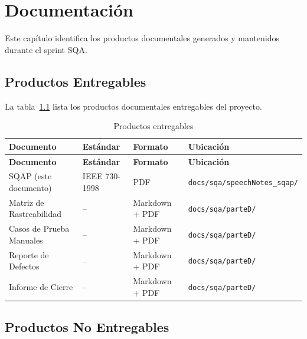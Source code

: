 \chapter{Documentación}
\label{sec:documentacion}

Este capítulo identifica los productos documentales generados y mantenidos durante el sprint SQA.

\section{Productos Entregables}
\label{sec:entregables}

La tabla~\ref{tab:entregables} lista los productos documentales entregables del proyecto.

\begin{longtable}{lp{4cm}p{4cm}p{3cm}}
\caption{Productos entregables}
\label{tab:entregables}\\
\toprule
\textbf{Documento} & \textbf{Estándar} & \textbf{Formato} & \textbf{Ubicación}\\
\midrule
\endfirsthead
\toprule
\textbf{Documento} & \textbf{Estándar} & \textbf{Formato} & \textbf{Ubicación}\\
\midrule
\endhead
\bottomrule
\endfoot

SQAP (este documento) & IEEE 730-1998 & PDF & \texttt{docs/sqa/speechNotes\_sqap/}\\

Matriz de Rastreabilidad & -- & Markdown + PDF & \texttt{docs/sqa/parteD/}\\

Casos de Prueba Manuales & -- & Markdown + PDF & \texttt{docs/sqa/parteD/}\\

Reporte de Defectos & -- & Markdown + PDF & \texttt{docs/sqa/parteD/}\\

Informe de Cierre & -- & Markdown + PDF & \texttt{docs/sqa/parteD/}\\

\end{longtable}

\section{Productos No Entregables}
\label{sec:no-entregables}

